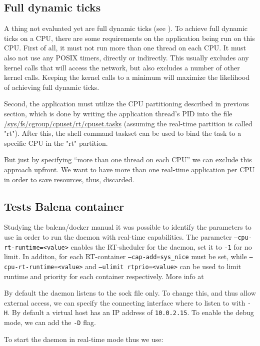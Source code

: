\documentclass[]{scrartcl}
\begin{document}
\subsection{Full dynamic ticks}

A thing not evaluated yet are full dynamic ticks (see \cite{lrt02}). To achieve full dynamic ticks on a CPU, there are some requirements on the application being run on this CPU. First of all, it must not run more than one thread on each CPU. It must also not use any POSIX timers, directly or indirectly. This usually excludes any kernel calls that will access the network, but also excludes a number of other kernel calls. Keeping the kernel calls to a minimum will maximize the likelihood of achieving full dynamic ticks.

Second, the application must utilize the CPU partitioning described in previous section, which is done by writing the application thread's PID into the file \url{/sys/fs/cgroup/cpuset/rt/cpuset.tasks} (assuming the real-time partition is called "rt"). After this, the shell command taskset can be used to bind the task to a specific CPU in the "rt" partition.

But just by specifying ``more than one thread on each CPU'' we can exclude this approach upfront. We want to have more than one real-time application per CPU in order to save resources, thus, discarded.

\subsection{Tests Balena container}

Studying the balena/docker manual it was possible to identify the parameters to use in order to run the daemon with real-time capabilities. The parameter \texttt{--cpu-rt-runtime=<value>} enables the RT-sheduler for the daemon, set it to \texttt{-1} for no limit. In additon, for each RT-container \texttt{--cap-add=sys\_nice} must be set, while \texttt{--cpu-rt-runtime=<value>} and \texttt{--ulimit rtprio=<value>} can be used to limit runtime and priority for each container respectively.
More info at \cite{docker06}

By default the daemon listens to the sock file only. To change this, and thus allow external access, we can specify the connecting interface where to listen to with \texttt{-H}. By default a virtual host has an IP address of \texttt{10.0.2.15}. To enable the debug mode, we can add the \texttt{-D} flag.

To start the daemon in real-time mode thus we use:
\end{document}
